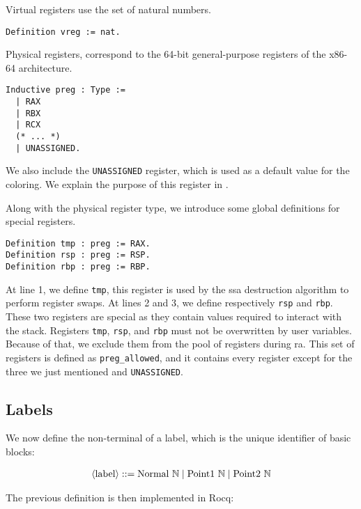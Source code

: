 Virtual registers use the set of natural numbers.

\begin{lstlisting}[style=Rocq]
Definition vreg := nat.
\end{lstlisting}

Physical registers, correspond to the 64-bit general-purpose registers of the x86-64 architecture.

\begin{lstlisting}[style=Rocq]
Inductive preg : Type :=
  | RAX
  | RBX
  | RCX
  (* ... *)
  | UNASSIGNED.
\end{lstlisting}

We also include the \texttt{UNASSIGNED} register, which is used as a default value for the coloring. We explain the purpose of this register in .

Along with the physical register type, we introduce some global definitions for special registers.

\begin{lstlisting}[style=Rocq]
Definition tmp : preg := RAX.
Definition rsp : preg := RSP.
Definition rbp : preg := RBP.
\end{lstlisting}

At line 1, we define \texttt{tmp}, this register is used by the \gls{ssa} destruction algorithm to perform register swaps. At lines 2 and 3, we define respectively \texttt{rsp} and \texttt{rbp}. These two registers are special as they contain values required to interact with the stack.
Registers \texttt{tmp}, \texttt{rsp}, and \texttt{rbp} must not be overwritten by user variables. Because of that, we exclude them from the pool of registers during \gls{ra}. This set of registers is defined as \texttt{preg\_allowed}, and it contains every register except for the three we just mentioned and \texttt{UNASSIGNED}.

\subsection{Labels}

We now define the non-terminal of a label, which is the unique identifier of basic blocks:

\begin{align*}
\langle\text{label}\rangle ::= \text{Normal} \ \mathbb N \mid \text{Point1} \ \mathbb N \mid \text{Point2} \ \mathbb N
\end{align*}

The previous definition is then implemented in Rocq:

